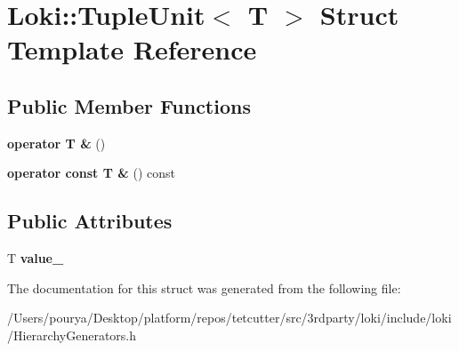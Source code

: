 \hypertarget{structLoki_1_1TupleUnit}{}\section{Loki\+:\+:Tuple\+Unit$<$ T $>$ Struct Template Reference}
\label{structLoki_1_1TupleUnit}
\subsection*{Public Member Functions}
\begin{DoxyCompactItemize}
\item 
\hypertarget{structLoki_1_1TupleUnit_a6318505b53095ed194a4bc31e1e9c5d6}{}{\bfseries operator T \&} ()\label{structLoki_1_1TupleUnit_a6318505b53095ed194a4bc31e1e9c5d6}

\item 
\hypertarget{structLoki_1_1TupleUnit_ae3185051155d647aad4479322937b626}{}{\bfseries operator const T \&} () const \label{structLoki_1_1TupleUnit_ae3185051155d647aad4479322937b626}

\end{DoxyCompactItemize}
\subsection*{Public Attributes}
\begin{DoxyCompactItemize}
\item 
\hypertarget{structLoki_1_1TupleUnit_aedd22444f9f15cbd749344ee4721717c}{}T {\bfseries value\+\_\+}\label{structLoki_1_1TupleUnit_aedd22444f9f15cbd749344ee4721717c}

\end{DoxyCompactItemize}


The documentation for this struct was generated from the following file\+:\begin{DoxyCompactItemize}
\item 
/\+Users/pourya/\+Desktop/platform/repos/tetcutter/src/3rdparty/loki/include/loki/Hierarchy\+Generators.\+h\end{DoxyCompactItemize}
